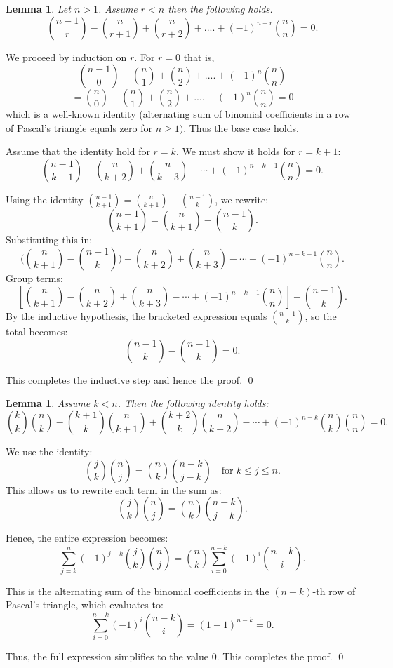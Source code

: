 \documentclass[11pt]{amsart}
\renewenvironment{proof}{{\bfseries Proof.}}{\qed}
\numberwithin{equation}{section}
\theoremstyle{plain}
\newtheorem{lemma}[theorem]{Lemma}
\theoremstyle{definition}
\numberwithin{equation}{section}
\begin{document}
	\begin{lemma}\label{BL1} Let $n>1$. Assume $r <n$ then the following holds. 
		$$\binom{n-1}{r}-\binom{n}{r+1}+\binom{n}{r+2}+....+(-1)^{n-r}\binom{n}{n} = 0.$$
		
	\end{lemma}
	\begin{proof}
		We proceed by induction on $r$. For $r=0$ that is, 	\[\binom{n-1}{0}-\binom{n}{1}+\binom{n}{2}+....+(-1)^{n}\binom{n}{n} \]
		\[=\binom{n}{0}-\binom{n}{1}+\binom{n}{2}+....+(-1)^{n}\binom{n}{n} =0\]
        which is a well-known identity (alternating sum of binomial coefficients in a row of Pascal's triangle equals zero for $n\geq1)$. Thus the base case holds.


		Assume that the identity hold for $r=k$. 	We must show it holds for \( r = k+1 \):
\[
\binom{n-1}{k+1} - \binom{n}{k+2} + \binom{n}{k+3} - \cdots + (-1)^{n-k-1} \binom{n}{n} = 0.
\]

Using the identity \( \binom{n-1}{k+1} = \binom{n}{k+1} - \binom{n-1}{k} \), we rewrite:
\[
\binom{n-1}{k+1} = \binom{n}{k+1} - \binom{n-1}{k}.
\]
Substituting this in:
\[
\bigg (\binom{n}{k+1} - \binom{n-1}{k}\bigg) - \binom{n}{k+2} + \binom{n}{k+3} - \cdots + (-1)^{n-k-1} \binom{n}{n}.
\]
Group terms:
\[
\left[ \binom{n}{k+1} - \binom{n}{k+2} + \binom{n}{k+3} - \cdots + (-1)^{n-k-1} \binom{n}{n} \right] - \binom{n-1}{k}.
\]
By the inductive hypothesis, the bracketed expression equals \( \binom{n-1}{k} \), so the total becomes:
\[
\binom{n-1}{k} - \binom{n-1}{k} = 0.
\]

This completes the inductive step and hence the proof.
	\end{proof}
	\begin{lemma}\label{BL2}
Assume \( k < n \). Then the following identity holds:
\[
\binom{k}{k}\binom{n}{k} - \binom{k+1}{k}\binom{n}{k+1} + \binom{k+2}{k}\binom{n}{k+2} - \cdots + (-1)^{n-k} \binom{n}{k} \binom{n}{n} = 0.
\]
\end{lemma}

\begin{proof}
We use the identity:
\[
\binom{j}{k} \binom{n}{j} = \binom{n}{k} \binom{n-k}{j-k}
\quad \text{for } k \leq j \leq n.
\]
This allows us to rewrite each term in the sum as:
\[
\binom{j}{k} \binom{n}{j} = \binom{n}{k} \binom{n-k}{j-k}.
\]

Hence, the entire expression becomes:
\[
\sum_{j = k}^{n} (-1)^{j-k} \binom{j}{k} \binom{n}{j}
= \binom{n}{k} \sum_{i=0}^{n-k} (-1)^i \binom{n-k}{i}.
\]

This is the alternating sum of the binomial coefficients in the \( (n-k) \)-th row of Pascal's triangle, which evaluates to:
\[
\sum_{i=0}^{n-k} (-1)^i \binom{n-k}{i} = (1 - 1)^{n-k} = 0.
\]

Thus, the full expression simplifies to the value $0$. 
This completes the proof.
\end{proof}
\end{document}

